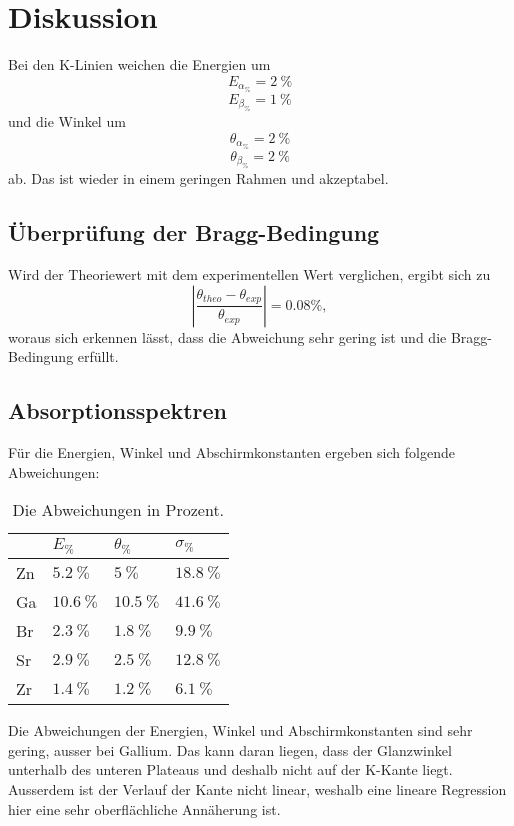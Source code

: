 \section{Diskussion}
Bei den K-Linien weichen die Energien um
\begin{equation*}
  E_{\alpha_{\%}}=2\ \%
\end{equation*}
\begin{equation*}
  E_{\beta_{\%}}=1\ \%
\end{equation*}
und die Winkel um
\begin{equation*}
  \theta_{\alpha_{\%}}=2\ \%
\end{equation*}
\begin{equation*}
  \theta_{\beta_{\%}}=2\ \%
\end{equation*}
ab. Das ist wieder in einem geringen Rahmen und akzeptabel.

\subsection{Überprüfung der Bragg-Bedingung}
Wird der Theoriewert mit dem experimentellen Wert verglichen, ergibt sich zu
\begin{equation*}
  |\frac{\theta_{theo}-\theta_{exp}}{\theta_{exp}}|=0.08\%,
\end{equation*}
woraus sich erkennen lässt, dass die Abweichung sehr gering ist und die Bragg-Bedingung erfüllt.


\subsection{Absorptionsspektren}
Für die Energien, Winkel und Abschirmkonstanten ergeben sich folgende Abweichungen:
\begin{table}[H]
  \centering
  \begin{tabular}{l|l|l|l}
  & $E_{\%}$ & $\theta_{\%}$ & $\sigma_{\%}$\\ \hline
  Zn & $5.2\ \%$ & $5\ \%$ & $18.8\ \%$\\ \hline
  Ga & $10.6\ \%$ & $10.5\ \%$ & $41.6\ \%$\\ \hline
  Br & $2.3\ \%$ & $1.8\ \%$ & $9.9\ \%$\\ \hline
  Sr & $2.9\ \%$ & $2.5\ \%$ & $12.8\ \%$\\ \hline
  Zr & $1.4\ \%$ & $1.2\ \%$ & $6.1\ \%$\\ \hline
  \end{tabular}
  \caption{Die Abweichungen in Prozent.}
\end{table}
Die Abweichungen der Energien, Winkel und Abschirmkonstanten sind sehr gering, ausser bei Gallium. Das kann daran liegen, dass der Glanzwinkel unterhalb des unteren Plateaus und deshalb nicht auf der K-Kante liegt. Ausserdem ist der Verlauf der Kante nicht linear, weshalb eine lineare Regression hier eine sehr oberflächliche Annäherung ist. 

